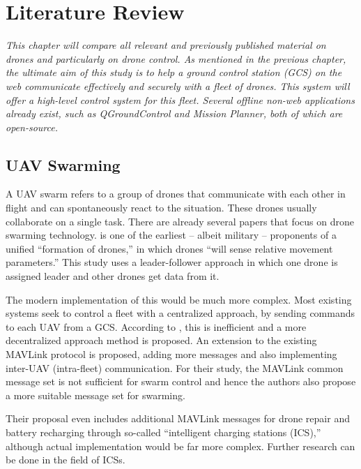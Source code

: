 \setlength{\footskip}{8mm}


\chapter{Literature Review} 
\label{ch:literature-review}

\textit{This chapter will compare all relevant and previously published material on drones and particularly on drone control. As mentioned in the previous chapter, the ultimate aim of this study is to help a ground control station (GCS) on the web communicate effectively and securely with a fleet of drones. This system will offer a high-level control system for this fleet. Several offline non-web applications already exist, such as QGroundControl and Mission Planner, both of which are open-source.
}

\section{UAV Swarming}

A UAV swarm refers to a group of drones that communicate with each other in flight and can spontaneously react to the situation. These drones usually collaborate on a single task. There are already several papers that focus on drone swarming technology.
 is one of the earliest – albeit military – proponents of a unified “formation of drones,” in which drones “will sense relative movement parameters.” This study uses a leader-follower approach in which one drone is assigned leader and other drones get data from it.

The modern implementation of this would be much more complex.
Most existing systems seek to control a fleet with a centralized approach, by sending commands to each UAV from a GCS. According to , this is inefficient and a more decentralized approach method is proposed. An extension to the existing MAVLink protocol is proposed, adding more messages and also implementing inter-UAV (intra-fleet) communication. For their study, the MAVLink common message set is not sufficient for swarm control and hence the authors also propose a more suitable message set for swarming.


Their proposal even includes additional MAVLink messages for drone repair and battery recharging through so-called “intelligent charging stations (ICS),” although actual implementation would be far more complex. Further research can be done in the field of ICSs.

